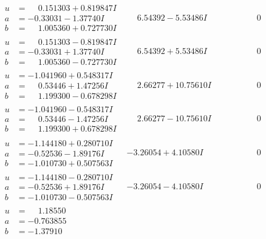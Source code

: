 \documentclass[1p]{elsarticle_modified}
\theoremstyle{definition}
\begin{document}
$$\begin{array}{c|c|c}
\begin{aligned}
u &= \phantom{-}0.151303 + 0.819847 I \\
a &= -0.33031 - 1.37740 I \\
b &= \phantom{-}1.005360 + 0.727730 I\end{aligned}
 & \phantom{-}6.54392 - 5.53486 I & \phantom{-0.000000 } 0 \\ \hline\begin{aligned}
u &= \phantom{-}0.151303 - 0.819847 I \\
a &= -0.33031 + 1.37740 I \\
b &= \phantom{-}1.005360 - 0.727730 I\end{aligned}
 & \phantom{-}6.54392 + 5.53486 I & \phantom{-0.000000 } 0 \\ \hline\begin{aligned}
u &= -1.041960 + 0.548317 I \\
a &= \phantom{-}0.53446 + 1.47256 I \\
b &= \phantom{-}1.199300 - 0.678298 I\end{aligned}
 & \phantom{-}2.66277 + 10.75610 I & \phantom{-0.000000 } 0 \\ \hline\begin{aligned}
u &= -1.041960 - 0.548317 I \\
a &= \phantom{-}0.53446 - 1.47256 I \\
b &= \phantom{-}1.199300 + 0.678298 I\end{aligned}
 & \phantom{-}2.66277 - 10.75610 I & \phantom{-0.000000 } 0 \\ \hline\begin{aligned}
u &= -1.144180 + 0.280710 I \\
a &= -0.52536 - 1.89176 I \\
b &= -1.010730 + 0.507563 I\end{aligned}
 & -3.26054 + 4.10580 I & \phantom{-0.000000 } 0 \\ \hline\begin{aligned}
u &= -1.144180 - 0.280710 I \\
a &= -0.52536 + 1.89176 I \\
b &= -1.010730 - 0.507563 I\end{aligned}
 & -3.26054 - 4.10580 I & \phantom{-0.000000 } 0 \\ \hline\begin{aligned}
u &= \phantom{-}1.18550\phantom{ +0.000000I} \\
a &= -0.763855\phantom{ +0.000000I} \\
b &= -1.37910\phantom{ +0.000000I}\end{aligned}

\end{array}$$
\end{document}
